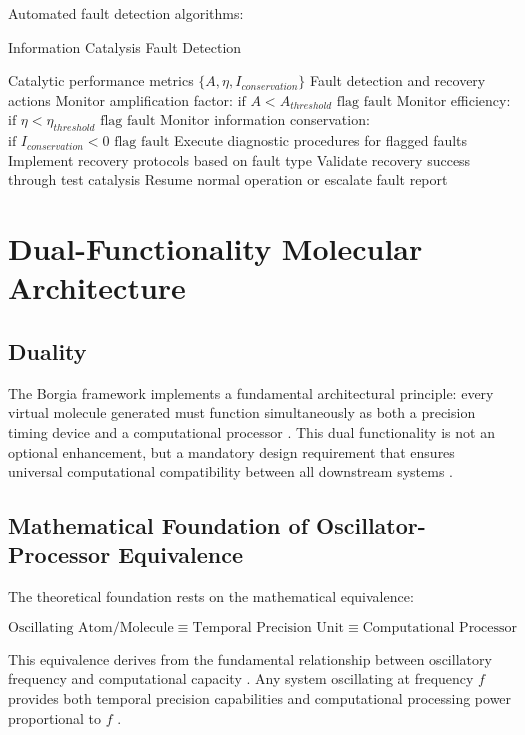 \documentclass[12pt,a4paper]{article}
\begin{document}
Automated fault detection algorithms:

\begin{algorithm}[H]
\caption{Information Catalysis Fault Detection}
\begin{algorithmic}[1]
\REQUIRE Catalytic performance metrics $\{A, \eta, I_{conservation}\}$
\ENSURE Fault detection and recovery actions
\STATE Monitor amplification factor: $\text{if } A < A_{threshold} \text{ flag fault}$
\STATE Monitor efficiency: $\text{if } \eta < \eta_{threshold} \text{ flag fault}$  
\STATE Monitor information conservation: $\text{if } I_{conservation} < 0 \text{ flag fault}$
\STATE Execute diagnostic procedures for flagged faults
\STATE Implement recovery protocols based on fault type
\STATE Validate recovery success through test catalysis
\STATE Resume normal operation or escalate fault report
\end{algorithmic}
\end{algorithm}

\section{Dual-Functionality Molecular Architecture}

\subsection{Duality}

The Borgia framework implements a fundamental architectural principle: every virtual molecule generated must function simultaneously as both a precision timing device and a computational processor . This dual functionality is not an optional enhancement, but a mandatory design requirement that ensures universal computational compatibility between all downstream systems \cite{sterling2015principles}.

\subsection{Mathematical Foundation of Oscillator-Processor Equivalence}

The theoretical foundation rests on the mathematical equivalence:

\begin{equation}
\text{Oscillating Atom/Molecule} \equiv \text{Temporal Precision Unit} \equiv \text{Computational Processor}
\end{equation}

This equivalence derives from the fundamental relationship between oscillatory frequency and computational capacity \cite{landauer1961irreversibility}. Any system oscillating at frequency $f$ provides both temporal precision capabilities and computational processing power proportional to $f$ \cite{lloyd2000ultimate}.
\end{document}
